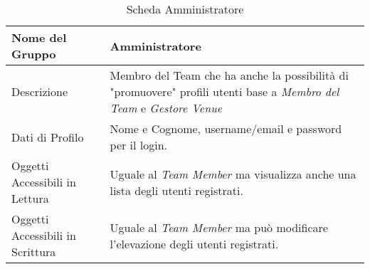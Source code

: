 \begin{table}[H]
    \begin{center}  
        \begin{tabular}{ | l | p{10cm} |} %
        \hline
        \textbf{Nome del Gruppo} & \textbf{Amministratore}\\ \hline  
           
        Descrizione & Membro del Team che ha anche la possibilità di "promuovere" profili utenti base a \textit{Membro del Team} e \textit{Gestore Venue}\\ \hline  
           
        Dati di Profilo & Nome e Cognome, username/email e password per il login.\\ \hline  
           
        Oggetti Accessibili in Lettura & Uguale al \textit{Team Member} ma visualizza anche una lista degli utenti registrati.\\ \hline  
           
        Oggetti Accessibili in Scrittura & Uguale al \textit{Team Member} ma può modificare l'elevazione degli utenti registrati.\\ \hline  
           
        \end{tabular}  
        \caption{Scheda Amministratore}
    \end{center}  
\end{table}